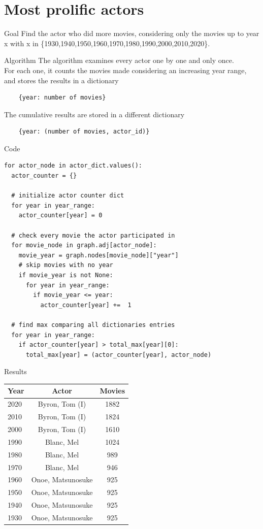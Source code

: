 \section{Most prolific actors}
\begin{frame}{Goal}
Find the actor who did more movies, considering only the movies up to year x with
x in \{1930,1940,1950,1960,1970,1980,1990,2000,2010,2020\}.
\end{frame}
\begin{frame}[fragile]{Algorithm}
The algorithm examines every actor one by one and only once. \\
For each one, it counts the movies made considering an increasing year range, and stores the results in a dictionary
\begin{verbatim}
    {year: number of movies}
\end{verbatim}
The cumulative results are stored in a different dictionary
\begin{verbatim}
    {year: (number of movies, actor_id)}
\end{verbatim}
\end{frame}
\begin{frame}[fragile]{Code}
\begin{lstlisting}
for actor_node in actor_dict.values():
  actor_counter = {}
    
  # initialize actor counter dict
  for year in year_range:  
    actor_counter[year] = 0
    
  # check every movie the actor participated in
  for movie_node in graph.adj[actor_node]: 
    movie_year = graph.nodes[movie_node]["year"]
    # skip movies with no year
    if movie_year is not None:  
      for year in year_range:
        if movie_year <= year:
          actor_counter[year] +=  1

  # find max comparing all dictionaries entries
  for year in year_range: 
    if actor_counter[year] > total_max[year][0]:
      total_max[year] = (actor_counter[year], actor_node)
\end{lstlisting}
\end{frame}
\begin{frame}{Results}
\centering
\begin{tabular}{|l|c|c|}
    \hline
     Year & Actor & Movies \\
     \hline \hline
     2020 & Byron, Tom (I) & 1882 \\
     2010 & Byron, Tom (I) & 1824 \\
     2000 & Byron, Tom (I) & 1610 \\ 
     1990 & Blanc, Mel & 1024 \\
     1980 & Blanc, Mel & 989 \\ 
     1970 & Blanc, Mel & 946 \\ 
     1960 & Onoe, Matsunosuke & 925 \\
     1950 & Onoe, Matsunosuke & 925 \\
     1940 & Onoe, Matsunosuke & 925 \\
     1930 & Onoe, Matsunosuke & 925 \\
     \hline
\end{tabular}
\end{frame}

